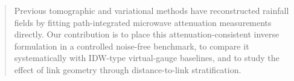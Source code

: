 \documentclass[11pt]{article}
\begin{document}
\begin{quote}
Previous tomographic and variational methods have reconstructed rainfall fields by fitting path-integrated microwave attenuation measurements directly.
Our contribution is to place this attenuation-consistent inverse formulation in a controlled noise-free benchmark, to compare it systematically with IDW-type virtual-gauge baselines, and to study the effect of link geometry through distance-to-link stratification.
\end{quote}
\end{document}
